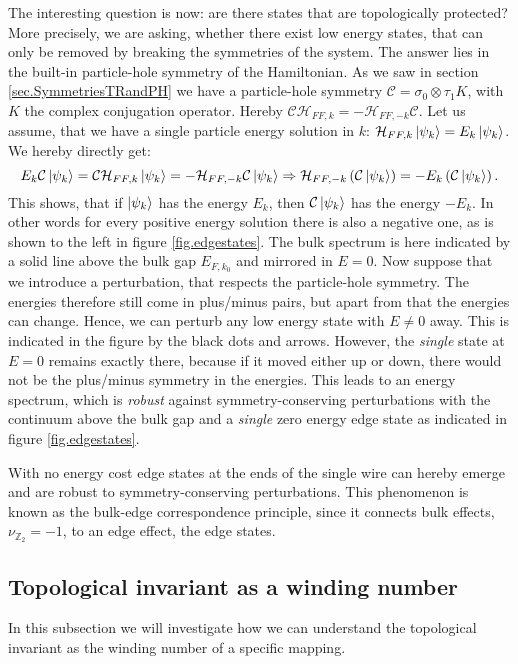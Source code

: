 The interesting question is now: are there states that are topologically protected? More precisely, we are asking, whether there exist low energy states, that can only be removed by breaking the symmetries of the system. The answer lies in the built-in particle-hole symmetry of the Hamiltonian. As we saw in section \ref{sec.SymmetriesTRandPH} we have a particle-hole symmetry $\mathcal{C} = \sigma_0\otimes\tau_1 K$, with $K$ the complex conjugation operator. Hereby $\mathcal{C}\mathcal{H}_{FF,k} = -\mathcal{H}_{FF,-k}\mathcal{C}$. Let us assume, that we have a single particle energy solution in $k$: $\mathcal{H}_{FF,k}\ket{\psi_k} = E_k\ket{\psi_k}$. We hereby directly get:
\begin{equation}
E_k\mathcal{C}\ket{\psi_k} = \mathcal{C}\mathcal{H}_{FF,k}\ket{\psi_k} = -\mathcal{H}_{FF,-k}\mathcal{C}\ket{\psi_k} \Rightarrow \mathcal{H}_{FF,-k}\left(\mathcal{C}\ket{\psi_k}\right) = -E_k\left(\mathcal{C}\ket{\psi_k}\right).
\end{equation}
This shows, that if $\ket{\psi_k}$ has the energy $E_k$, then $\mathcal{C}\ket{\psi_k}$ has the energy $-E_k$. In other words for every positive energy solution there is also a negative one, as is shown to the left in figure \ref{fig.edgestates}. The bulk spectrum is here indicated by a solid line above the bulk gap $E_{F,k_0}$ and mirrored in $E = 0$. Now suppose that we introduce a perturbation, that respects the particle-hole symmetry. The energies therefore still come in plus/minus pairs, but apart from that the energies can change. Hence, we can perturb any low energy state with $E \neq 0 $ away. This is indicated in the figure by the black dots and arrows. However, the \textit{single} state at $E = 0$ remains exactly there, because if it moved either up or down, there would not be the plus/minus symmetry in the energies. This leads to an energy spectrum, which is \textit{robust} against symmetry-conserving perturbations with the continuum above the bulk gap and a \textit{single} zero energy edge state as indicated in figure \ref{fig.edgestates}. 

With no energy cost edge states at the ends of the single wire can hereby emerge and are robust to symmetry-conserving perturbations. This phenomenon is known as the bulk-edge correspondence principle, since it connects bulk effects, $\nu_{\mathbb{Z}_2} = - 1$, to an edge effect, the edge states.

\subsection{Topological invariant as a winding number} \label{subsec.windingnumber}
In this subsection we will investigate how we can understand the topological invariant as the winding number of a specific mapping. 

